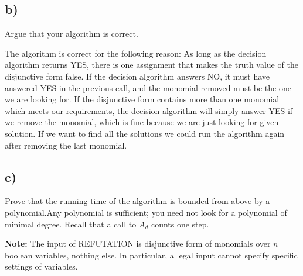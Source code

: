 \documentclass[11pt]{article}
\begin{document}
\subsection*{b)}
Argue that your algorithm is correct. \newline

The algorithm is correct for the following reason: As long as the decision algorithm returns YES, there is one assignment that makes the truth value of the disjunctive form false. If the decision algorithm answers NO, it must have answered YES in the previous call, and the monomial removed must be the one we are looking for.
If the disjunctive form contains more than one monomial which meets our requirements, the decision algorithm will simply answer YES if we remove the monomial, which is fine because we are just looking for given solution. If we want to find all the solutions we could run the algorithm again after removing the last monomial. 
  
\subsection*{c)}
Prove that the running time of the algorithm is bounded from above by a polynomial.Any polynomial is sufficient; you need not look for a polynomial of minimal degree. Recall that a call to $A_{d}$ counts one step.



\newline \newline
\textbf{Note:} The input of REFUTATION is disjunctive form of monomials over $n$ boolean variables, nothing else. In particular, a legal input cannot specify specific settings of variables.
\end{document}
